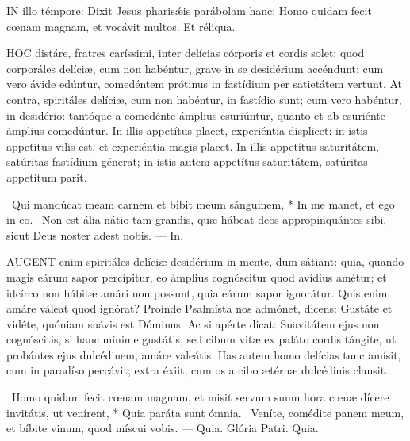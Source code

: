 


\lettrine[lines=2]{I}{N} illo témpore: Dixit Jesus pharisǽis parábolam hanc: Homo quidam fecit cœnam magnam, et vocávit multos. Et réliqua.



\lettrine[lines=2]{H}{OC} distáre, fratres caríssimi, inter delícias córporis et cordis solet: quod corporáles delíciæ, cum non habéntur, grave in se desidérium accéndunt; cum vero ávide edúntur, comedéntem prótinus in fastídium per satietátem vertunt. At contra, spiritáles delíciæ, cum non habéntur, in fastídio sunt; cum vero habéntur, in desidério: tantóque a comedénte ámplius esuriúntur, quanto et ab esuriénte ámplius comedúntur. In illis appetítus placet, experiéntia dísplicet: in istis appetítus vilis est, et experiéntia magis placet. In illis appetítus saturitátem, satúritas fastídium génerat; in istis autem appetítus saturitátem, satúritas appetítum parit.

\R\ Qui mandúcat meam carnem et bibit meum sánguinem, * In me manet, et ego in eo. \V\ Non est ália nátio tam grandis, quæ hábeat deos appropinquántes sibi, sicut Deus noster adest nobis. --- In.


\lettrine[lines=2]{A}{UGENT} enim spiritáles delíciæ desidérium in mente, dum sátiant: quia, quando magis eárum sapor percípitur, eo ámplius cognóscitur quod avídius amétur; et idcírco non hábitæ amári non possunt, quia eárum sapor ignorátur. Quis enim amáre váleat quod ignórat? Proínde Psalmísta nos admónet, dicens: Gustáte et vidéte, quóniam suávis est Dóminus. Ac si apérte dicat: Suavitátem ejus non cognóscitis, si hanc mínime gustátis; sed cibum vitæ ex paláto cordis tángite, ut probántes ejus dulcédinem, amáre valeátis. Has autem homo delícias tunc amísit, cum in paradíso peccávit; extra éxiit, cum os a cibo ætérnæ dulcédinis clausit.

\R\ Homo quidam fecit cœnam magnam, et misit servum suum hora cœnæ dícere invitátis, ut venírent, * Quia paráta sunt ómnia. \V\ Veníte, comédite panem meum, et bíbite vinum, quod míscui vobis. --- Quia. Glória Patri. Quia.


